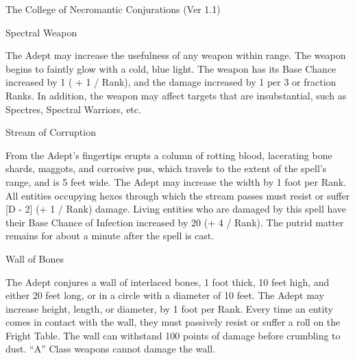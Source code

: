 \begin{Chapter}{The College of Necromantic Conjurations (Ver 1.1)}
\begin{spell}[S-13]{Spectral Weapon}

\begin{effects}
The Adept may increase the usefulness of any weapon within range. The
weapon begins to faintly glow with a cold, blue light.  The weapon has
its Base Chance increased by 1 ( + 1 / Rank), and the damage increased
by 1 per 3 or fraction Ranks.  In addition, the weapon may affect
targets that are insubstantial, such as Spectres, Spectral Warriors,
etc.
\end{effects}
\end{spell}

\begin{spell}[S-14]{Stream of Corruption}

\begin{effects}
From the Adept’s fingertips erupts a column of rotting blood,
lacerating bone shards, maggots, and corrosive pus, which travels to
the extent of the spell’s range, and is 5 feet wide. The Adept may
increase the width by 1 foot per Rank.  All entities occupying hexes
through which the stream passes must resist or suffer [D - 2] (+ 1 /
Rank) damage.  Living entities who are damaged by this spell have
their Base Chance of Infection increased by 20 (+ 4 / Rank).  The
putrid matter remains for about a minute after the spell is cast.
\end{effects}
\end{spell}

\begin{spell}[S-15]{Wall of Bones}

\begin{effects}
The Adept conjures a wall of interlaced bones, 1 foot thick, 10 feet
high, and either 20 feet long, or in a circle with a diameter of 10
feet. The Adept may increase height, length, or diameter, by 1 foot
per Rank.  Every time an entity comes in contact with the wall, they
must passively resist or suffer a roll on the Fright Table.  The wall
can withstand 100 points of damage before crumbling to dust.  “A”
Class weapons cannot damage the wall.
\end{effects}
\end{spell}


\end{Chapter}
